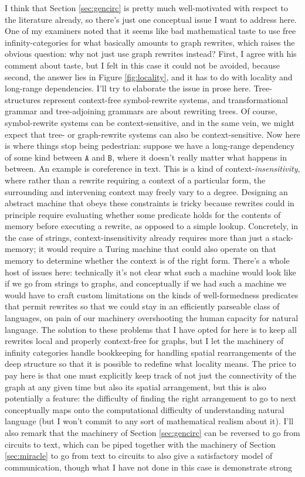 I think that Section \ref{sec:gencirc} is pretty much well-motivated with respect to the literature already, so there's just one conceptual issue I want to address here. One of my examiners noted that it seems like bad mathematical taste to use free infinity-categories for what basically amounts to graph rewrites, which raises the obvious question: why not just use graph rewrites instead? First, I agree with his comment about taste, but I felt in this case it could not be avoided, because second, the answer lies in Figure \ref{fig:locality}, and it has to do with locality and long-range dependencies. I'll try to elaborate the issue in prose here. Tree-structures represent context-free symbol-rewrite systems, and transformational grammar and tree-adjoining grammars are about rewriting trees. Of course, symbol-rewrite systems can be context-sensitive, and in the same vein, we might expect that tree- or graph-rewrite systems can also be context-sensitive. Now here is where things stop being pedestrian: suppose we have a long-range dependency of some kind between $\texttt{A}$ and $\texttt{B}$, where it doesn't really matter what happens in between. An example is coreference in text. This is a kind of context-\emph{insensitivity}, where rather than a rewrite requiring a context of a particular form, the surrounding and intervening context may freely vary to a degree. Designing an abstract machine that obeys these constraints is tricky because rewrites could in principle require evaluating whether some predicate holds for the contents of memory before executing a rewrite, as opposed to a simple lookup. Concretely, in the case of strings, context-insensitivity already requires more than just a stack-memory; it would require a Turing machine that could also operate on that memory to determine whether the context is of the right form. There's a whole host of issues here: technically it's not clear what such a machine would look like if we go from strings to graphs, and conceptually if we had such a machine we would have to craft custom limitations on the kinds of well-formedness predicates that permit rewrites so that we could stay in an efficiently parseable class of languages, on pain of our machinery overshooting the human capacity for natural language. The solution to these problems that I have opted for here is to keep all rewrites local and properly context-free for graphs, but I let the machinery of infinity categories handle bookkeeping for handling spatial rearrangements of the deep structure so that it is possible to redefine what locality means. The price to pay here is that one must explicitly keep track of not just the connectivity of the graph at any given time but also its spatial arrangement, but this is also potentially a feature: the difficulty of finding the right arrangement to go to next conceptually maps onto the computational difficulty of understanding natural language (but I won't commit to any sort of mathematical realism about it). I'll also remark that the machinery of Section \ref{sec:gencirc} can be reversed to go from circuits to text, which can be piped together with the machinery of Section \ref{sec:miracle} to go from text to circuits to also give a satisfactory model of communication, though what I have not done in this case is demonstrate strong 